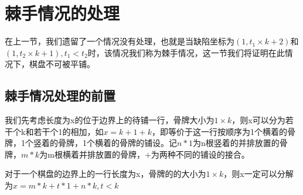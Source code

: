 \chapter{棘手情况的处理}

在上一节，我们遗留了一个情况没有处理，也就是当缺陷坐标为$(1, t_1 \times k + 2)$和$(1, t_2 \times k + 1), t_1 < t_2$时，该情况我们称为棘手情况，这一节我们将证明在此情况下，棋盘不可被平铺。
\section{棘手情况处理的前置}
我们先考虑长度为x的位于边界上的待铺一行，骨牌大小为$1 \times k$，则x可以分为若干个k和若干个1的相加，如$x = k + 1 + k$，即等价于这一行按顺序为1个横着的骨牌，1个竖着的骨牌，1个横着的骨牌的铺设。记$n * 1$为n根竖着的并排放置的骨牌，$m * k$为m根横着并排放置的骨牌，$+$为两种不同的铺设的接合。
\begin{theorem}
    对于一个棋盘的边界上的一行长度为x，骨牌的的大小为$1 \times k$，则x一定可以分解为$x = m * k + t * 1 + n * k, t < k$

    \label{basic-theorem-4}
\end{theorem}
